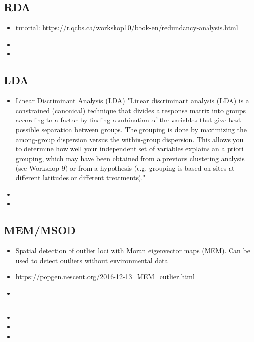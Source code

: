 \documentclass[document.tex]{subfiles}
\begin{document}
        \subsection{RDA }
        \begin{itemize}
        \item tutorial: https://r.qcbs.ca/workshop10/book-en/redundancy-analysis.html
        \item 
        \item 
        \end{itemize} 

        \subsection{LDA \citetitle{}}
        \begin{itemize}
        \item Linear Discriminant Analysis (LDA) "Linear discriminant analysis (LDA) is a constrained (canonical) technique that divides a response matrix into groups according to a factor by finding combination of the variables that give best possible separation between groups. The grouping is done by maximizing the among-group dispersion versus the within-group dispersion. This allows you to determine how well your independent set of variables explains an a priori grouping, which may have been obtained from a previous clustering analysis (see Workshop 9) or from a hypothesis (e.g. grouping is based on sites at different latitudes or different treatments)."
        \item 
        \item 
        \end{itemize} 

        \subsection{MEM/MSOD \citetitle{}}
        \begin{itemize}
        \item Spatial detection of outlier loci with Moran eigenvector maps (MEM). Can be used to detect outliers without environmental data
        \item https://popgen.nescent.org/2016-12-13_MEM_outlier.html
        \item 
        \end{itemize} 

        \subsection{ \citetitle{}}
        \begin{itemize}
        \item 
        \item 
        \item 
        \end{itemize} 
\end{document}
